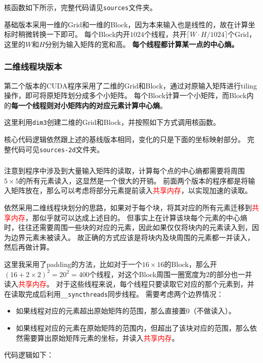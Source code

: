 \documentclass[logo,reportComp]{thesis}
\def\globalmem{\textcolor{black}{\kaiti 全局内存}}
\def\sharedmem{\textcolor{red}{\kaiti 共享内存}}
\begin{document}
核函数如下所示，完整代码请见\verb'sources'文件夹。


基础版本采用一维的Grid和一维的Block，因为本来输入也是线性的，故在计算坐标时稍微转换一下即可。
每个Block内开$1024$个线程，共开$\lceil W\cdot H/1024\rceil$个Grid，这里的$W$和$H$分别为输入矩阵的宽和高。
\textbf{每个线程都计算某一点的中心熵。}


\subsubsection{二维线程块版本}
第二个版本的CUDA程序采用了二维的Grid和Block，通过对原输入矩阵进行tiling操作，即可将原矩阵划分成多个小矩阵。
每个Block计算一个小矩阵，而Block内的\textbf{每一个线程则对小矩阵内的对应元素计算中心熵}。

这里利用\verb'dim3'创建二维的Grid和Block，并按照如下方式调用核函数。


核心代码逻辑依然跟上述的基线版本相同，变化的只是下面的坐标映射部分。
完整代码可见\verb'sources-2d'文件夹。


\subsubsection{}
注意到程序中涉及到大量输入矩阵的读取，计算每个点的中心熵都需要将周围$5\times 5$的所有元素读入，这显然是一个很大的开销。
前面两个版本的程序都是将输入矩阵放在，那么可以考虑将部分元素提前读入\sharedmem，以实现加速的读取。

依然采用二维线程块划分的思路，如果对于每个块，将其对应的所有元素迁移到\sharedmem，那似乎就可以达成上述目的。
但事实上在计算该块每个元素的中心熵时，往往还需要周围一些块的对应的元素，因此如果仅仅将块内的元素读入到，因为边界元素未被读入。
故正确的方式应该是将块内及块周围的元素都一并读入，然后再做计算。

这里我采用了padding的方法，比如对于一个$16\times 16$的Block，那么开$(16+2\times 2)^2=20^2=400$个线程，对这个Block周围一圈宽度为$2$的部分也一并读入\sharedmem。
对于这些线程来说，每个线程只要读取它对应的那个元素到，并在读取完成后利用\verb'__syncthreads'同步线程。
需要考虑两个边界情况：
\begin{itemize}
	\item 如果线程对应的元素超出原始矩阵的范围，那么直接置$0$（不做读入）。
	\item 如果线程对应的元素在原始矩阵的范围内，但超出了该块对应的范围，那么依然需要算出原始矩阵元素的坐标，并读入\sharedmem。
\end{itemize}
代码逻辑如下：

\end{document}
